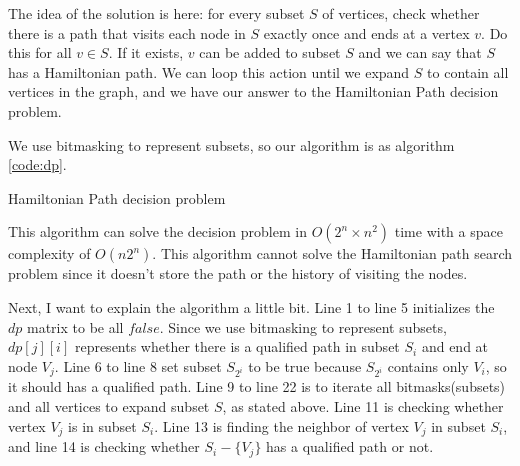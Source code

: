 \begin{solution}

    The idea of the solution is here: for every subset $S$ of vertices, check whether there is a path that visits each node in $S$ exactly once and ends at a vertex $v$. Do this for all $v \in S$. If it exists, $v$ can be added to subset $S$ and we can say that $S$ has a Hamiltonian path. We can loop this action until we expand $S$ to contain all vertices in the graph, and we have our answer to the Hamiltonian Path decision problem. 
    
    We use bitmasking to represent subsets, so our algorithm is as algorithm \ref{code:dp}.
    
    \begin{algorithm}
    	\caption{Hamiltonian Path decision problem} 
    	\label{code:dp}
    	\begin{algorithmic}[1]
        	\ENDFOR
    	\ENDFOR
    	\ENDFOR
    	                    \ENDIF
    	                \ENDIF
    	            \ENDFOR
    	        \ENDIF
    	   \ENDFOR
    	\ENDFOR
            \ENDIF
        \ENDFOR
        \end{algorithmic}
    \end{algorithm}

    This algorithm can solve the decision problem in $O(2^n \times n^2)$ time with a space complexity of $O(n2^n)$. This algorithm cannot solve the Hamiltonian path search problem since it doesn't store the path or the history of visiting the nodes. 
    
    Next, I want to explain the algorithm a little bit. Line 1 to line 5 initializes the $dp$ matrix to be all $false$. Since we use bitmasking to represent subsets, $dp[j][i]$ represents whether there is a qualified path in subset $S_i$ and end at node $V_j$. Line 6 to line 8 set subset $S_{2^i}$ to be true because $S_{2^i}$ contains only $V_i$, so it should has a qualified path. Line 9 to line 22 is to iterate all bitmasks(subsets) and all vertices to expand subset $S$, as stated above. Line 11 is checking whether vertex $V_j$ is in subset $S_i$. Line 13 is finding the neighbor of vertex $V_j$ in subset $S_i$, and line 14 is checking whether $S_i - \{V_j\}$ has a qualified path or not. 
    

\end{solution}
